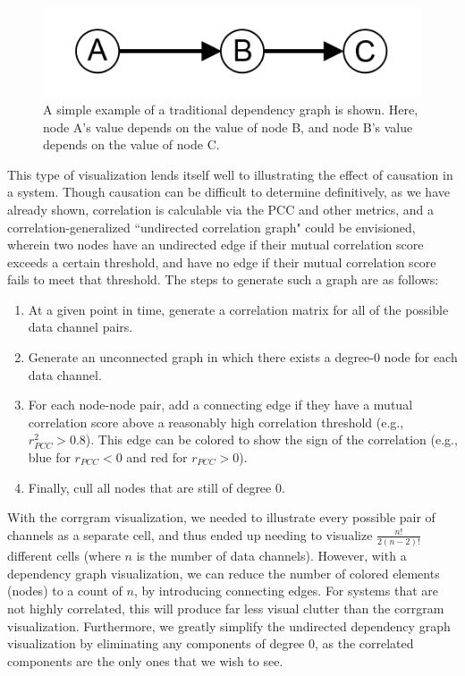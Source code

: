 \begin{figure}[h]
\centering
    \includegraphics{images/dependency_graph_example.png}
    \caption{A simple example of a traditional dependency graph is shown. Here, node A's value depends on the value of node B, and node B's value depends on the value of node C.}
    \label{fig:dependency_graph_example}
\end{figure}

This type of visualization lends itself well to illustrating the effect of causation in a system. Though causation can be difficult to determine definitively, as we have already shown, correlation is calculable via the PCC and other metrics, and a correlation-generalized ``undirected correlation graph" could be envisioned, wherein two nodes have an undirected edge if their mutual correlation score exceeds a certain threshold, and have no edge if their mutual correlation score fails to meet that threshold. The steps to generate such a graph are as follows:

\begin{enumerate}
    \item At a given point in time, generate a correlation matrix for all of the possible data channel pairs.
    \item Generate an unconnected graph in which there exists a degree-0 node for each data channel.
    \item For each node-node pair, add a connecting edge if they have a mutual correlation score above a reasonably high correlation threshold (e.g., $r_{PCC}^{2} > 0.8$). This edge can be colored to show the sign of the correlation (e.g., blue for $r_{PCC} < 0$ and red for $r_{PCC} > 0$).
    \item Finally, cull all nodes that are still of degree 0.
\end{enumerate}

With the corrgram visualization, we needed to illustrate every possible pair of channels as a separate cell, and thus ended up needing to visualize $\frac{n!}{2 (n - 2)!}$ different cells (where $n$ is the number of data channels). However, with a dependency graph visualization, we can reduce the number of colored elements (nodes) to a count of $n$, by introducing connecting edges. For systems that are not highly correlated, this will produce far less visual clutter than the corrgram visualization. Furthermore, we greatly simplify the undirected dependency graph visualization by eliminating any components of degree 0, as the correlated components are the only ones that we wish to see.

